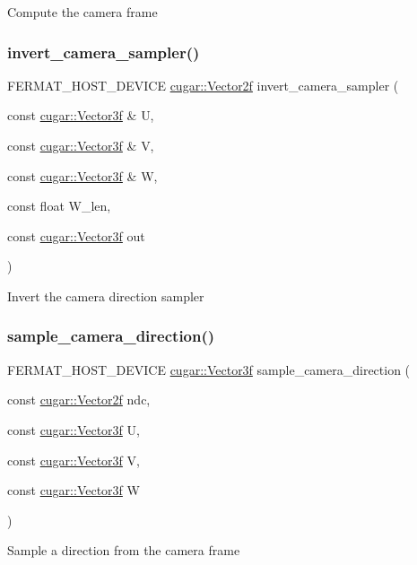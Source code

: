 Compute the camera frame \mbox{\label{group___camera_module_gab65ffc1b980d9f84bd7170e9e3b6941e}} 
\subsubsection{\texorpdfstring{invert\+\_\+camera\+\_\+sampler()}{invert\_camera\_sampler()}}
{\footnotesize\ttfamily F\+E\+R\+M\+A\+T\+\_\+\+H\+O\+S\+T\+\_\+\+D\+E\+V\+I\+CE \hyperlink{structcugar_1_1_vector}{cugar\+::\+Vector2f} invert\+\_\+camera\+\_\+sampler (\begin{DoxyParamCaption}\item[{const \hyperlink{structcugar_1_1_vector}{cugar\+::\+Vector3f} \&}]{U,  }\item[{const \hyperlink{structcugar_1_1_vector}{cugar\+::\+Vector3f} \&}]{V,  }\item[{const \hyperlink{structcugar_1_1_vector}{cugar\+::\+Vector3f} \&}]{W,  }\item[{const float}]{W\+\_\+len,  }\item[{const \hyperlink{structcugar_1_1_vector}{cugar\+::\+Vector3f}}]{out }\end{DoxyParamCaption})\hspace{0.3cm}{\ttfamily [inline]}}

Invert the camera direction sampler \mbox{\label{group___camera_module_ga74952c76421084e0c5b86cac3c0522c3}} 
\subsubsection{\texorpdfstring{sample\+\_\+camera\+\_\+direction()}{sample\_camera\_direction()}}
{\footnotesize\ttfamily F\+E\+R\+M\+A\+T\+\_\+\+H\+O\+S\+T\+\_\+\+D\+E\+V\+I\+CE \hyperlink{structcugar_1_1_vector}{cugar\+::\+Vector3f} sample\+\_\+camera\+\_\+direction (\begin{DoxyParamCaption}\item[{const \hyperlink{structcugar_1_1_vector}{cugar\+::\+Vector2f}}]{ndc,  }\item[{const \hyperlink{structcugar_1_1_vector}{cugar\+::\+Vector3f}}]{U,  }\item[{const \hyperlink{structcugar_1_1_vector}{cugar\+::\+Vector3f}}]{V,  }\item[{const \hyperlink{structcugar_1_1_vector}{cugar\+::\+Vector3f}}]{W }\end{DoxyParamCaption})\hspace{0.3cm}{\ttfamily [inline]}}

Sample a direction from the camera frame 
